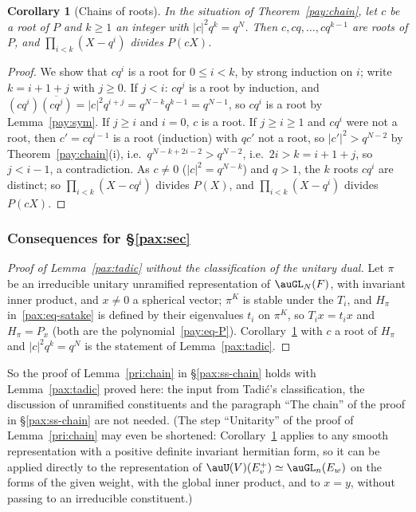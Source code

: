 \documentclass[10pt]{amsart}
\newtheorem{corollary}[theorem]{Corollary}
\theoremstyle{definition}
\theoremstyle{remark}
\begin{document}
\begin{corollary}[Chains of roots]\label{pay:roots}
In the situation of Theorem~\ref{pay:chain}, let $c$ be a root of $P$ and $k\ge1$ an integer with
$|c|^2q^k=q^N$. Then $c,cq,\dots,cq^{k-1}$ are roots of $P$, and $\prod_{i<k}(X-q^i)$ divides $P(cX)$.
\end{corollary}
\begin{proof}
We show that $cq^i$ is a root for $0\le i<k$, by strong induction on $i$; write $k=i+1+j$ with $j\ge0$.
If $j<i$: $cq^j$ is a root by induction, and $(cq^i)\overline{(cq^j)}=|c|^2q^{i+j}=q^{N-k}q^{k-1}=q^{N-1}$,
so $cq^i$ is a root by Lemma~\ref{pay:sym}. If $j\ge i$ and $i=0$, $c$ is a root. If $j\ge i\ge1$ and
$cq^i$ were not a root, then $c'=cq^{i-1}$ is a root (induction) with $qc'$ not a root, so
$|c'|^2>q^{N-2}$ by Theorem~\ref{pay:chain}(i), i.e.\ $q^{N-k+2i-2}>q^{N-2}$, i.e.\ $2i>k=i+1+j$, so
$j<i-1$, a contradiction. As $c\ne0$ ($|c|^2=q^{N-k}$) and $q>1$, the $k$ roots $cq^i$ are distinct;
so $\prod_{i<k}(X-cq^i)$ divides $P(X)$, and $\prod_{i<k}(X-q^i)$ divides $P(cX)$.
\end{proof}

\subsubsection{Consequences for \S\ref{pax:sec}}\label{pay:ss-cons}

\begin{proof}[Proof of Lemma~\ref{pax:tadic} without the classification of the unitary dual]
Let $\pi$ be an irreducible unitary unramified representation of $\auGL_N(F)$, with invariant inner
product, and $x\ne0$ a spherical vector; $\pi^K$ is stable under the $T_i$, and $H_\pi$
in~\eqref{pax:eq-satake} is defined by their eigenvalues $t_i$ on $\pi^K$, so $T_ix=t_ix$ and $H_\pi=
P_x$ (both are the polynomial~\eqref{pay:eq-P}). Corollary~\ref{pay:roots} with $c$ a root of $H_\pi$
and $|c|^2q^k=q^N$ is the statement of Lemma~\ref{pax:tadic}.
\end{proof}

So the proof of Lemma~\ref{pri:chain} in \S\ref{pax:ss-chain} holds with Lemma~\ref{pax:tadic} proved
here: the input from Tadi\'c's classification, the discussion of unramified constituents and the
paragraph ``The chain'' of the proof in \S\ref{pax:ss-chain} are not needed. (The step ``Unitarity'' of the proof of Lemma~\ref{pri:chain} may even be shortened:
Corollary~\ref{pay:roots} applies to any smooth representation with a positive definite invariant
hermitian form, so it can be applied directly to the representation of $\auU(V)(E^+_v)\simeq
\auGL_n(E_w)$ on the forms of the given weight, with the global inner product, and to $x=y$, without
passing to an irreducible constituent.)
\end{document}
